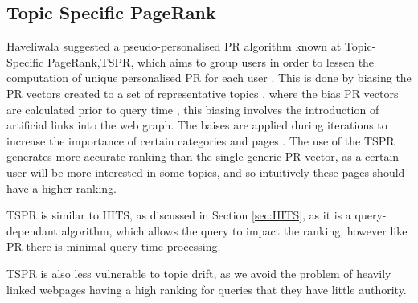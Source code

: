 \documentclass[11pt]{report}
\begin{document}
\subsection{Topic Specific PageRank} \label{sec:Topic specific PR}
Haveliwala suggested a pseudo-personalised PR algorithm known at Topic-Specific PageRank,TSPR, which aims to group users in order to lessen the computation of unique personalised PR for each user \cite{haveliwala2002topic}. This is done by biasing the PR vectors created to a set of representative topics \cite{haveliwala2002topic}, where the bias PR vectors are calculated prior to query time \cite{langville}, this biasing involves the introduction of artificial links into the web graph. The baises are applied during iterations to increase the importance of certain categories and pages \cite{haveliwala1999efficient}. The use of the TSPR generates more accurate ranking than the single generic PR vector, as a certain user will be more interested in some topics, and so intuitively these pages should have a higher ranking. 

TSPR is similar to HITS, as discussed in Section \ref{sec:HITS}, as it is a query-dependant algorithm, which allows the query to impact the ranking, however like PR there is minimal query-time processing. 

TSPR is also less vulnerable to topic drift, as we avoid the problem of heavily linked webpages having a high ranking for queries that they have little authority. 
\end{document}
